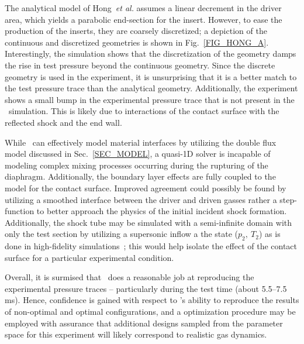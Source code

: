 The analytical model of Hong~\emph{et al.} assumes a linear decrement in the driver area, which yields a parabolic end-section for the insert. However, to ease the production of the inserts, they are coarsely discretized; a depiction of the continuous and discretized geometries is shown in Fig.~\ref{FIG_HONG_A}. Interestingly, the simulation shows that the discretization of the geometry damps the rise in test pressure beyond the continuous geometry. Since the discrete geometry is used in the experiment, it is unsurprising that it is a better match to the test pressure trace than the analytical geometry. Additionally, the experiment shows a small bump in the experimental pressure trace that is not present in the \stnshk\ simulation. This is likely due to interactions of the contact surface with the reflected shock and the end wall.
 
 While \stnshk\ can effectively model material interfaces by utilizing the double flux model discussed in Sec.~\ref{SEC_MODEL}, a quasi-1D solver is incapable of modeling complex mixing processes occurring during the rupturing of the diaphragm. Additionally, the boundary layer effects are fully coupled to the model for the contact surface. Improved agreement could possibly be found by utilizing a smoothed interface between the driver and driven gasses rather a step-function to better approach the physics of the initial incident shock formation. Additionally, the shock tube may be simulated with a semi-infinite domain with only the test section by utilizing a supersonic inflow a the state ($p_2,\ T_2$) as is done in high-fidelity simulations~\cite{GROGAN_PCI2015}; this would help isolate the effect of the contact surface for a particular experimental condition.

 Overall, it is surmised that \stnshk\ does a reasonable job at reproducing the experimental pressure traces -- particularly during the test time (about 5.5--7.5 ms). Hence, confidence is gained with respect to \stnshk's ability to reproduce the results of non-optimal and optimal configurations, and a optimization procedure may be employed with assurance that additional designs sampled from the parameter space for this experiment will likely correspond to realistic gas dynamics. 

